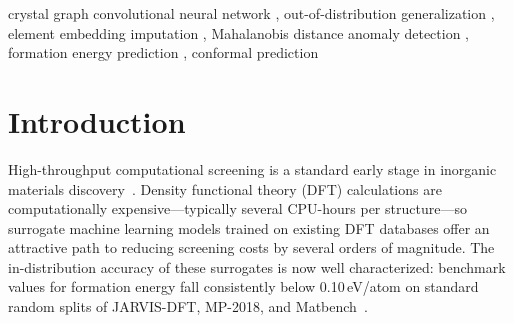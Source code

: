 \documentclass[final,5p,twocolumn,10pt]{elsarticle}
\newcommand{\mae}{\text{MAE}}
\newcommand{\auroc}{\text{AUROC}}
\newcommand{\cgcnn}{\texttt{CGCNN}}
\newcommand{\zsni}{\textsc{zsni}}
\begin{document}
\begin{frontmatter}
\begin{abstract}
whereas the Magpie-feature Random Forest baseline degrades by only
1.7-fold (from 0.106 to 0.181\,eV/atom), because Magpie descriptors
encode tabulated elemental properties for all 92 elements without requiring
per-element training gradients.
A Mahalanobis distance detector---fitted on the 64-dimensional training
embeddings $\{\bm{z}_i\}_{i \in \mathcal{D}_{\text{train}}}$ with diagonal
regularization $\bm{\Sigma}_{\text{reg}} = \mathrm{Cov}(\bm{Z}_{\text{train}}) + 10^{-5}\bm{I}_{64}$---separates
excluded-element structures from in-distribution samples with $\auroc{} > 0.999$;
routing flagged inputs to the Random Forest fallback recovers 76.6\% conformal coverage.
Zero-Shot Node Imputation (\zsni{}) directly patches each untrained column
$\bm{W}_{\text{emb}}[:,e]$ by averaging the $k_{\text{imp}}=2$ nearest seen
elements in standardized periodic-table row/group coordinate space, without
any gradient update or access to target labels. This single operation reduces
Formation Energy \mae{} by 67.1\% (from 0.557 to 0.183\,eV/atom) and closes
97.8\% of the Band Gap performance gap (from 0.411 to 0.322\,eV versus the
Random Forest baseline of 0.320\,eV), while recovering split-conformal
prediction coverage from 18.5\% to 58.6\% under the fixed $q_{0.90}=0.162$\,eV
calibration bound. Taken together, these results indicate that effective retrieval
for crystal \cgcnn{} models requires node-level intervention prior to
global pooling.
\end{abstract}

\begin{keyword}
crystal graph convolutional neural network \sep
out-of-distribution generalization \sep
element embedding imputation \sep
Mahalanobis distance anomaly detection \sep
formation energy prediction \sep
conformal prediction
\end{keyword}

\end{frontmatter}

\section{Introduction}
\label{sec:intro}

High-throughput computational screening is a standard early stage in inorganic
materials discovery~\cite{butler2018machine, schmidt2019recent, dunn2020matbench}.
Density functional theory (DFT) calculations are computationally expensive---typically
several CPU-hours per structure---so surrogate machine learning models trained
on existing DFT databases offer an attractive path to reducing screening costs
by several orders of magnitude. The in-distribution accuracy of these surrogates
is now well characterized: benchmark \mae{} values for formation energy fall
consistently below 0.10\,eV/atom on standard random splits of JARVIS-DFT,
MP-2018, and Matbench~\cite{xie2018crystal, choudhary2021atomistic, chen2019megnet}.
\end{document}

